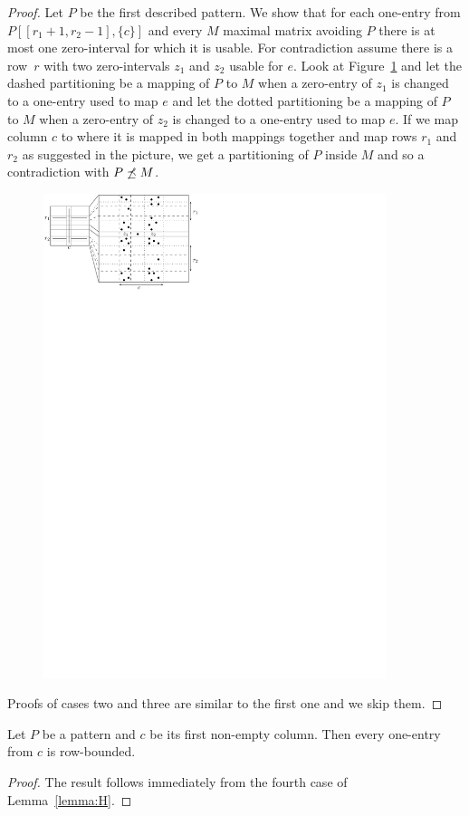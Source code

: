 \begin{proof}
Let $P$ be the first described pattern. We show that for each one-entry from $P[[r_1+1,r_2-1],\{c\}]$ and every $M$ maximal matrix avoiding $P$ there is at most one zero-interval for which it is usable. For contradiction assume there is a row~$r$ with two zero-intervals $z_1$ and $z_2$ usable for $e$. Look at Figure~\ref{fig:lemmaI1} and let the dashed partitioning be a mapping of $P$ to $M$ when a zero-entry of $z_1$ is changed to a one-entry used to map $e$ and let the dotted partitioning be a mapping of $P$ to $M$ when a zero-entry of $z_2$ is changed to a one-entry used to map $e$. If we map column $c$ to where it is mapped in both mappings together and map rows $r_1$ and $r_2$ as suggested in the picture, we get a partitioning of $P$ inside $M$ and so a contradiction with $P\not\preceq M$.

\begin{figure}[!ht]
\centering
\includegraphics[width=100mm]{img/lemmaI1.pdf}
\caption{}
\label{fig:lemmaI1}
\end{figure}

Proofs of cases two and three are similar to the first one and we skip them.
\end{proof}

\begin{lemma}
\label{lemma:First}
Let $P$ be a pattern and $c$ be its first non-empty column. Then every one-entry from $c$ is row-bounded.
\end{lemma}
\begin{proof}
The result follows immediately from the fourth case of Lemma~\ref{lemma:H}.
\end{proof}

